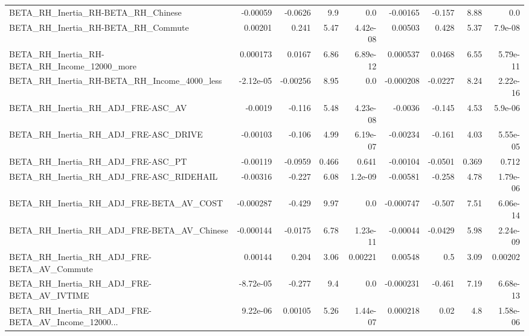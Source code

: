 \begin{tabular}{lrrrrrrrr}
BETA\_RH\_Inertia\_RH-BETA\_RH\_Chinese                 &    -0.00059 &      -0.0626 &      9.9 &      0.0 &   -0.00165 &      -0.157 &         8.88 &           0.0 \\
BETA\_RH\_Inertia\_RH-BETA\_RH\_Commute                 &     0.00201 &        0.241 &     5.47 & 4.42e-08 &    0.00503 &       0.428 &         5.37 &       7.9e-08 \\
BETA\_RH\_Inertia\_RH-BETA\_RH\_Income\_12000\_more       &    0.000173 &       0.0167 &     6.86 & 6.89e-12 &   0.000537 &      0.0468 &         6.55 &      5.79e-11 \\
BETA\_RH\_Inertia\_RH-BETA\_RH\_Income\_4000\_less        &   -2.12e-05 &     -0.00256 &     8.95 &      0.0 &  -0.000208 &     -0.0227 &         8.24 &      2.22e-16 \\
BETA\_RH\_Inertia\_RH\_ADJ\_FRE-ASC\_AV                  &     -0.0019 &       -0.116 &     5.48 & 4.23e-08 &    -0.0036 &      -0.145 &         4.53 &       5.9e-06 \\
BETA\_RH\_Inertia\_RH\_ADJ\_FRE-ASC\_DRIVE               &    -0.00103 &       -0.106 &     4.99 & 6.19e-07 &   -0.00234 &      -0.161 &         4.03 &      5.55e-05 \\
BETA\_RH\_Inertia\_RH\_ADJ\_FRE-ASC\_PT                  &    -0.00119 &      -0.0959 &    0.466 &    0.641 &   -0.00104 &     -0.0501 &        0.369 &         0.712 \\
BETA\_RH\_Inertia\_RH\_ADJ\_FRE-ASC\_RIDEHAIL            &    -0.00316 &       -0.227 &     6.08 &  1.2e-09 &   -0.00581 &      -0.258 &         4.78 &      1.79e-06 \\
BETA\_RH\_Inertia\_RH\_ADJ\_FRE-BETA\_AV\_COST            &   -0.000287 &       -0.429 &     9.97 &      0.0 &  -0.000747 &      -0.507 &         7.51 &      6.06e-14 \\
BETA\_RH\_Inertia\_RH\_ADJ\_FRE-BETA\_AV\_Chinese         &   -0.000144 &      -0.0175 &     6.78 & 1.23e-11 &   -0.00044 &     -0.0429 &         5.98 &      2.24e-09 \\
BETA\_RH\_Inertia\_RH\_ADJ\_FRE-BETA\_AV\_Commute         &     0.00144 &        0.204 &     3.06 &  0.00221 &    0.00548 &         0.5 &         3.09 &       0.00202 \\
BETA\_RH\_Inertia\_RH\_ADJ\_FRE-BETA\_AV\_IVTIME          &   -8.72e-05 &       -0.277 &      9.4 &      0.0 &  -0.000231 &      -0.461 &         7.19 &      6.68e-13 \\
BETA\_RH\_Inertia\_RH\_ADJ\_FRE-BETA\_AV\_Income\_12000... &    9.22e-06 &      0.00105 &     5.26 & 1.44e-07 &   0.000218 &        0.02 &          4.8 &      1.58e-06 \\

\end{tabular}
